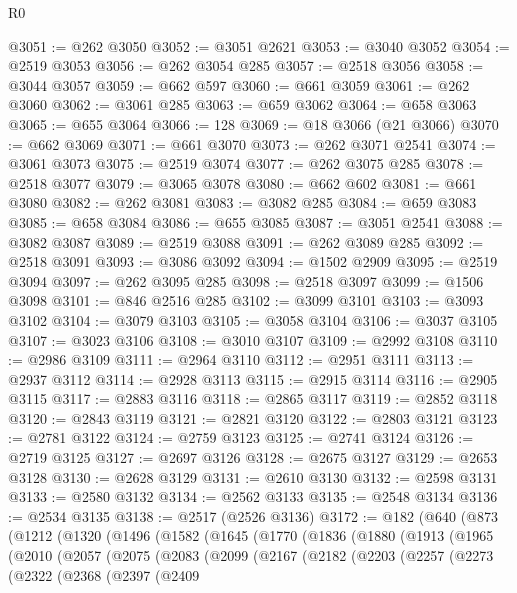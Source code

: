 \begin{lexlean}{R0}
\begin{coremodule}
@3051 := @262 @3050
@3052 := @3051 @2621
@3053 := @3040 @3052
@3054 := @2519 @3053
@3056 := @262 @3054 @285
@3057 := @2518 @3056
@3058 := @3044 @3057
@3059 := @662 @597
@3060 := @661 @3059
@3061 := @262 @3060
@3062 := @3061 @285
@3063 := @659 @3062
@3064 := @658 @3063
@3065 := @655 @3064
@3066 := 128
@3069 := @18 @3066 (@21 @3066)
@3070 := @662 @3069
@3071 := @661 @3070
@3073 := @262 @3071 @2541
@3074 := @3061 @3073
@3075 := @2519 @3074
@3077 := @262 @3075 @285
@3078 := @2518 @3077
@3079 := @3065 @3078
@3080 := @662 @602
@3081 := @661 @3080
@3082 := @262 @3081
@3083 := @3082 @285
@3084 := @659 @3083
@3085 := @658 @3084
@3086 := @655 @3085
@3087 := @3051 @2541
@3088 := @3082 @3087
@3089 := @2519 @3088
@3091 := @262 @3089 @285
@3092 := @2518 @3091
@3093 := @3086 @3092
@3094 := @1502 @2909
@3095 := @2519 @3094
@3097 := @262 @3095 @285
@3098 := @2518 @3097
@3099 := @1506 @3098
@3101 := @846 @2516 @285
@3102 := @3099 @3101
@3103 := @3093 @3102
@3104 := @3079 @3103
@3105 := @3058 @3104
@3106 := @3037 @3105
@3107 := @3023 @3106
@3108 := @3010 @3107
@3109 := @2992 @3108
@3110 := @2986 @3109
@3111 := @2964 @3110
@3112 := @2951 @3111
@3113 := @2937 @3112
@3114 := @2928 @3113
@3115 := @2915 @3114
@3116 := @2905 @3115
@3117 := @2883 @3116
@3118 := @2865 @3117
@3119 := @2852 @3118
@3120 := @2843 @3119
@3121 := @2821 @3120
@3122 := @2803 @3121
@3123 := @2781 @3122
@3124 := @2759 @3123
@3125 := @2741 @3124
@3126 := @2719 @3125
@3127 := @2697 @3126
@3128 := @2675 @3127
@3129 := @2653 @3128
@3130 := @2628 @3129
@3131 := @2610 @3130
@3132 := @2598 @3131
@3133 := @2580 @3132
@3134 := @2562 @3133
@3135 := @2548 @3134
@3136 := @2534 @3135
@3138 := @2517 (@2526 @3136)
@3172 := @182
    (@640
      (@873
        (@1212
          (@1320
            (@1496
              (@1582
                (@1645
                  (@1770
                    (@1836
                      (@1880
                        (@1913
                          (@1965
                            (@2010
                              (@2057
                                (@2075
                                  (@2083
                                    (@2099
                                      (@2167
                                        (@2182
                                          (@2203
                                            (@2257
                                              (@2273
                                                (@2322
                                                  (@2368
                                                    (@2397
                                                      (@2409

\end{coremodule}
\end{lexlean}
